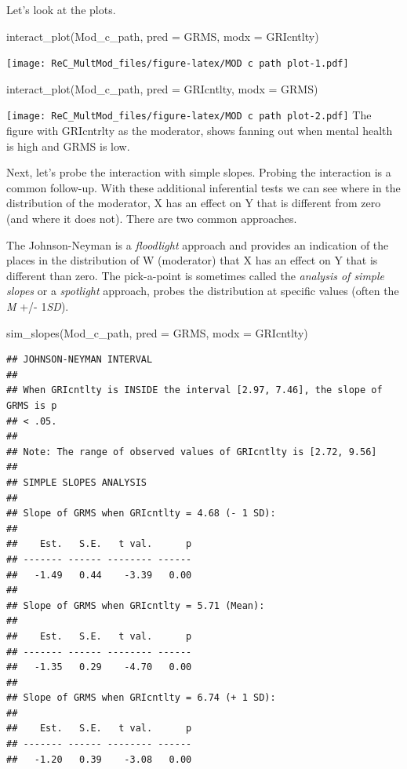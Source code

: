 \documentclass[
  english,
]{book}
\newenvironment{Shaded}{\begin{snugshade}}{\end{snugshade}}
\newcommand{\AttributeTok}[1]{\textcolor[rgb]{0.77,0.63,0.00}{#1}}
\newcommand{\FunctionTok}[1]{\textcolor[rgb]{0.00,0.00,0.00}{#1}}
\newcommand{\NormalTok}[1]{#1}
\begin{document}
Let's look at the plots.

\begin{Shaded}
\begin{Highlighting}[]
\FunctionTok{interact\_plot}\NormalTok{(Mod\_c\_path, }\AttributeTok{pred =}\NormalTok{ GRMS, }\AttributeTok{modx =}\NormalTok{ GRIcntlty)}
\end{Highlighting}
\end{Shaded}

\texttt{[image: ReC\_MultMod\_files/figure-latex/MOD c path plot-1.pdf]}

\begin{Shaded}
\begin{Highlighting}[]
\FunctionTok{interact\_plot}\NormalTok{(Mod\_c\_path, }\AttributeTok{pred =}\NormalTok{ GRIcntlty, }\AttributeTok{modx =}\NormalTok{ GRMS)}
\end{Highlighting}
\end{Shaded}

\texttt{[image: ReC\_MultMod\_files/figure-latex/MOD c path plot-2.pdf]}
The figure with GRIcntrlty as the moderator, shows fanning out when mental health is high and GRMS is low.

Next, let's probe the interaction with simple slopes. Probing the interaction is a common follow-up. With these additional inferential tests we can see where in the distribution of the moderator, X has an effect on Y that is different from zero (and where it does not). There are two common approaches.

The Johnson-Neyman is a \emph{floodlight} approach and provides an indication of the places in the distribution of W (moderator) that X has an effect on Y that is different than zero. The pick-a-point is sometimes called the \emph{analysis of simple slopes} or a \emph{spotlight} approach, probes the distribution at specific values (often the \emph{M} +/- 1\emph{SD}).

\begin{Shaded}
\begin{Highlighting}[]
\FunctionTok{sim\_slopes}\NormalTok{(Mod\_c\_path, }\AttributeTok{pred =}\NormalTok{ GRMS, }\AttributeTok{modx =}\NormalTok{ GRIcntlty)}
\end{Highlighting}
\end{Shaded}

\begin{verbatim}
## JOHNSON-NEYMAN INTERVAL 
## 
## When GRIcntlty is INSIDE the interval [2.97, 7.46], the slope of GRMS is p
## < .05.
## 
## Note: The range of observed values of GRIcntlty is [2.72, 9.56]
## 
## SIMPLE SLOPES ANALYSIS 
## 
## Slope of GRMS when GRIcntlty = 4.68 (- 1 SD): 
## 
##    Est.   S.E.   t val.      p
## ------- ------ -------- ------
##   -1.49   0.44    -3.39   0.00
## 
## Slope of GRMS when GRIcntlty = 5.71 (Mean): 
## 
##    Est.   S.E.   t val.      p
## ------- ------ -------- ------
##   -1.35   0.29    -4.70   0.00
## 
## Slope of GRMS when GRIcntlty = 6.74 (+ 1 SD): 
## 
##    Est.   S.E.   t val.      p
## ------- ------ -------- ------
##   -1.20   0.39    -3.08   0.00
\end{verbatim}
\end{document}
